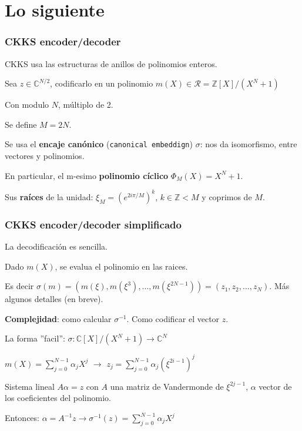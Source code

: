 \documentclass[10pt]{beamer}
\begin{document}
\section{Lo siguiente}
\begin{frame}
\frametitle{CKKS encoder/decoder}

CKKS usa las estructuras de anillos de polinomios enteros.

Sea $z\in \mathbb{C}^{N/2}$, codificarlo en un polinomio  $m(X)\in \mathcal{R} = \mathbb{Z}[X]/(X^N+1)$

Con modulo $N$, múltiplo de 2.

\pause
Se define $M=2N$.

Se usa el \textbf{encaje canónico} (\texttt{canonical embeddign}) $\sigma$:
nos da isomorfismo, entre vectores y polinomios.

\pause

En particular, el m-esimo \textbf{polinomio cíclico} $\Phi_M(X)= X^N+1$.


Sus \textbf{raíces} de la unidad: $\xi_M=(e^{2i\pi/M})^k$, $k\in \mathbb{Z}<M$ y coprimos de $M$.


\end{frame}


\begin{frame}
\frametitle{CKKS encoder/decoder simplificado}

La decodificación es sencilla.

Dado $m(X)$, se evalua el polinomio en las raices.

\pause
Es decir $\sigma(m) = (m(\xi), m(\xi^3),..., m(\xi^{2N-1}))= (z_1, z_2, ..., z_N)$. Más algunos detalles (en breve).

\textbf{Complejidad}: como calcular $\sigma^{-1}$. Como codificar el vector $z$.

\pause
La forma ''facil'': $\sigma: \mathbb{C}[X]/(X^N+1) \to \mathbb{C}^N$

$m(X) = \sum_{j=0}^{N-1} \alpha_j X^j$ $\to$ $z_j =  \sum_{j=0}^{N-1} \alpha_j (\xi^{2i-1})^j$

\pause
Sistema lineal $A\alpha=z$ con $A$ una matriz de Vandermonde de $\xi^{2j-1}$, $\alpha$ vector
de los coeficientes del polinomio.

Entonces: $\alpha = A^{-1}z \to \sigma^{-1}(z)=\sum_{j=0}^{N-1} \alpha_j X^j$
\end{frame}
\end{document}
